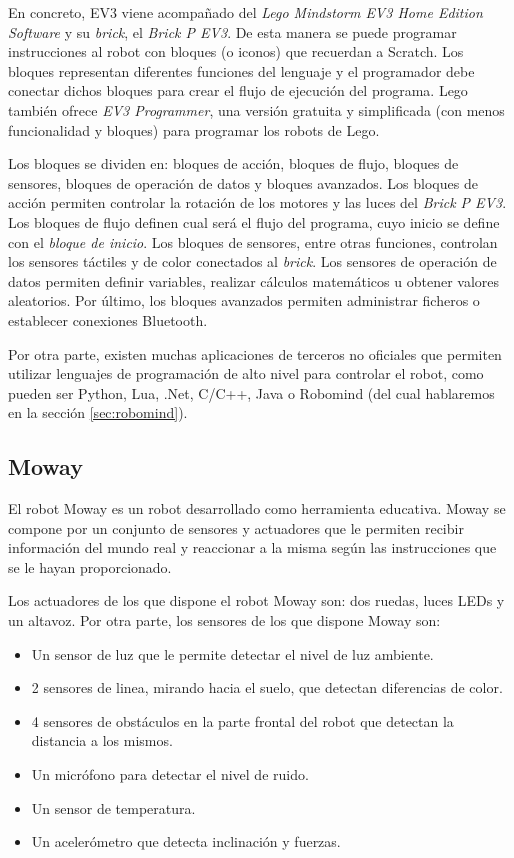 En concreto, EV3 viene acompañado del \emph{Lego Mindstorm EV3 Home Edition Software} y su \emph{brick}, el \emph{Brick P EV3}. De esta manera se puede programar instrucciones al robot con bloques (o iconos) que recuerdan a Scratch. Los bloques representan diferentes funciones del lenguaje y el programador debe conectar dichos bloques para crear el flujo de ejecución del programa. Lego también ofrece \emph{EV3 Programmer}, una versión gratuita y simplificada (con menos funcionalidad y bloques) para programar los robots de Lego.

Los bloques se dividen en: bloques de acción, bloques de flujo, bloques de sensores, bloques de operación de datos y bloques avanzados. 
Los bloques de acción permiten controlar la rotación de los motores y las luces del \emph{Brick P EV3}. Los bloques de flujo definen cual será el flujo del programa, cuyo inicio se define con el \emph{bloque de inicio}. Los bloques de sensores, entre otras funciones, controlan los sensores táctiles y de color conectados al \emph{brick}. Los sensores de operación de datos permiten definir variables, realizar cálculos matemáticos u obtener valores aleatorios. Por último, los bloques avanzados permiten administrar ficheros o establecer conexiones Bluetooth.

Por otra parte, existen muchas aplicaciones de terceros no oficiales que permiten utilizar lenguajes de programación de alto nivel para controlar el robot, como pueden ser Python, Lua, .Net, C/C++, Java o Robomind (del cual hablaremos en la sección \ref{sec:robomind}).


\subsection{Moway}
\label{sec:moway}


El robot Moway\cite{moway} es un robot desarrollado como herramienta educativa. Moway se compone por un conjunto de sensores y actuadores que le permiten recibir información del mundo real y reaccionar a la misma según las instrucciones que se le hayan proporcionado.

Los actuadores de los que dispone el robot Moway son: dos ruedas, luces LEDs y un altavoz. Por otra parte, los sensores de los que dispone Moway son:
 
\begin{itemize}
	\item Un sensor de luz que le permite detectar el nivel de luz ambiente. 
	\item 2 sensores de linea, mirando hacia el suelo, que detectan diferencias de color.
	\item 4 sensores de obstáculos en la parte frontal del robot que detectan la distancia a los mismos.
	\item Un micrófono para detectar el nivel de ruido.
	\item Un sensor de temperatura. 
	\item Un acelerómetro que detecta inclinación y fuerzas.
\end{itemize}

